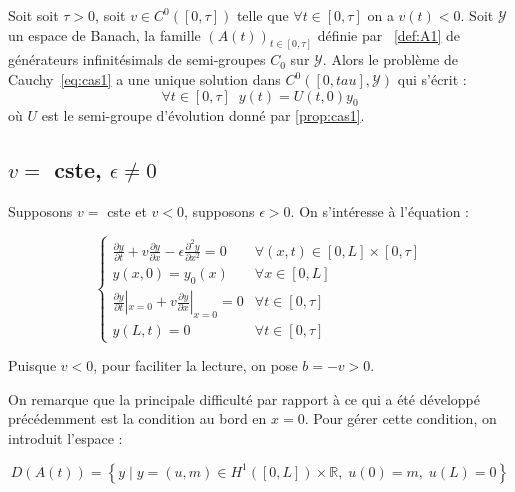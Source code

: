 \documentclass[a4paper]{article}
\newcommand{\dep}{b}
\begin{document}
\begin{theoreme}
	Soit soit $\tau>0$, soit $v \in C^0([0,\tau])$ telle que $\forall t \in [0,\tau]$ on a $v(t)<0$.
	Soit $\mathscr{Y}$ un espace de Banach, la famille $(A(t))_{t \in [0,\tau]}$ 
	définie par ~\eqref{def:A1}
	de générateurs infinitésimals de semi-groupes $C_0$ sur $\mathscr{Y}$.
	Alors le problème de Cauchy~\eqref{eq:cas1} a une unique solution dans $C^0([0,tau],\mathscr{Y})$ qui s'écrit :
	\[ \forall t\in[0,\tau] \; \; y(t) = U(t,0)y_0 \]
	où $U$ est le semi-groupe d'évolution donné par \ref{prop:cas1}.
\end{theoreme}



\vspace{1.0cm}
\subsection{$v =$ cste, $\epsilon \ne 0$}

Supposons $v=$ cste et $v<0$, supposons $\epsilon>0$. 
On s'intéresse à l'équation :


\begin{equation}
\label{eq:cas2}
\begin{cases}
 \displaystyle \frac{\partial y}{\partial t}
 + v \frac{\partial y} {\partial x}  
 - \epsilon \frac{\partial^2 y} {\partial x^2}
 = 0  & \forall (x,t) \in [0,L] \times [0, \tau]\\
 y(x,0) = y_{0} (x) & \forall x \in [0,L] \\
 \displaystyle \frac{\partial y}{\partial t}|_{x=0}
 + v \frac{\partial y} {\partial x}|_{x=0} = 0 & \forall t \in [0,\tau]\\
 y(L,t)=0 & \forall t \in [0,\tau]
\end{cases}
\end{equation}

Puisque $v<0$, pour faciliter la lecture, on pose $\dep = - v >0$.

On remarque que la principale difficulté par rapport à ce qui a été développé 
précédemment est la condition au bord en $x=0$.
Pour gérer cette condition, on introduit l'espace :

\[D(A(t)) = \left\{ y \; | \; y = (u,m) \in H^1([0,L])\times \mathbb{R},
 \; u(0)=m, \; u(L)=0 \right\} \]
 
\end{document}
